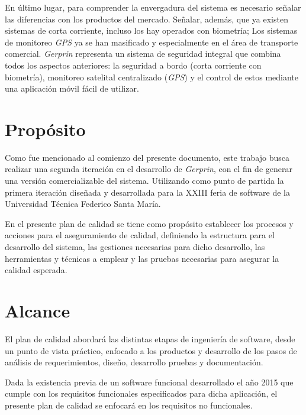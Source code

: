  En último lugar, para comprender la envergadura del sistema es necesario señalar las diferencias con los productos del mercado. Señalar, además, que ya existen sistemas de corta corriente, incluso los hay operados con biometría; Los sistemas de monitoreo \textit{GPS} ya se han masificado y especialmente en el área de transporte comercial. \textit{Gerprin} representa un sistema de seguridad integral que combina todos los aspectos anteriores: la seguridad a bordo (corta corriente con biometría), monitoreo satelital centralizado (\textit{GPS}) y el control de estos mediante una aplicación móvil fácil de utilizar.

\section{Propósito}

Como fue mencionado al comienzo del presente documento, este trabajo busca realizar una segunda iteración en el desarrollo de \textit{Gerprin}, con el fin de generar una versión comercializable del sistema. Utilizando como punto de partida la primera iteración diseñada y desarrollada para la XXIII feria de software de la Universidad Técnica Federico Santa María.

En el presente plan de calidad se tiene como propósito establecer los procesos y acciones para el aseguramiento de calidad, definiendo la estructura para el desarrollo del sistema, las gestiones necesarias para dicho desarrollo, las herramientas y técnicas a emplear y las pruebas necesarias para asegurar la calidad esperada.

\section{Alcance}

El plan de calidad abordará las distintas etapas de ingeniería de software, desde un punto de vista práctico, enfocado a los productos y desarrollo de los pasos de análisis de requerimientos, diseño, desarrollo pruebas y documentación.

Dada la existencia previa de un software funcional desarrollado el año 2015 que cumple con los requisitos funcionales especificados para dicha aplicación, el presente plan de calidad se enfocará en los requisitos no funcionales.
